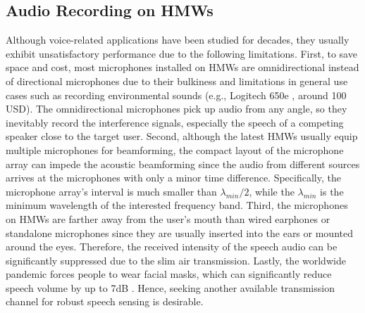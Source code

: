 \subsection{Audio Recording on HMWs}
Although voice-related applications have been studied for decades, they usually exhibit unsatisfactory performance due to the following limitations. 
First, to save space and cost, most microphones installed on HMWs are omnidirectional instead of directional microphones due to their bulkiness and limitations in general use cases such as recording environmental sounds (e.g., Logitech 650e \citep{Logitech34:online}, around 100 USD). The omnidirectional microphones pick up audio from any angle, so they inevitably record the interference signals, especially the speech of a competing speaker close to the target user.
Second, although the latest HMWs usually equip multiple microphones for beamforming, the compact layout of the microphone array can impede the acoustic beamforming since the audio from different sources arrives at the microphones with only a minor time difference. Specifically, the microphone array's interval is much smaller than $\lambda_{min}/2$, while the $\lambda_{min}$ is the minimum wavelength of the interested frequency band.
Third, the microphones on HMWs are farther away from the user’s mouth than wired earphones or standalone microphones since they are usually inserted into the ears or mounted around the eyes. Therefore, the received intensity of the speech audio can be significantly suppressed due to the slim air transmission. 
Lastly, the worldwide pandemic forces people to wear facial masks, which can significantly reduce speech volume by up to 7dB \citep{porschmann2020impact}. 
Hence, seeking another available transmission channel for robust speech sensing is desirable.

